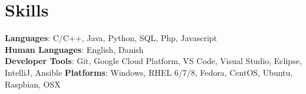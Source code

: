 \documentclass[a4paper,11pt]{article}
\begin{document}
\section{Skills}
 \begin{itemize}[leftmargin=0.15in, label={}]
    \small{\item{
     \textbf{Languages}{: C/C++, Java, Python, SQL, Php, Javascript} \\
     \textbf{Human Languages}{: English, Danish} \\
     \textbf{Developer Tools}{: Git, Google Cloud Platform, VS Code, Visual Studio, Eclipse, IntelliJ, Ansible}
    \textbf{Platforms}{: Windows, RHEL 6/7/8, Fedora, CentOS, Ubuntu, Raspbian, OSX }
     }
     }
 \end{itemize}


%
\iffalse
\section{Technical Skills}
 \begin{itemize}[leftmargin=0.15in, label={}]
    \small{\item{
     \textbf{Languages}{: Python, C/C++, SQL, JavaScript, HTML/CSS, R} \\
     \textbf{Frameworks}{: WordPress} \\
     \textbf{Developer Tools}{: Jupyter Notebooks, Git, Google Cloud Platform, VS Code, Amazon AWS} \\
     \textbf{Libraries}{: pandas, plotly}
    }}
 \end{itemize}
\fi

\end{document}
